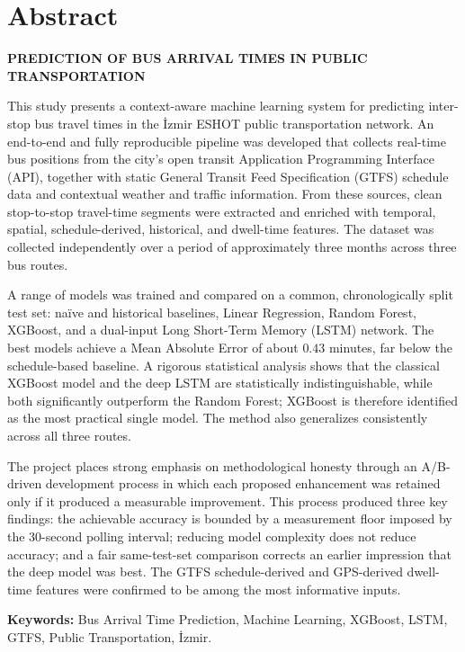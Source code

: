 \chapter*{Abstract}

\begin{center}
\textbf{PREDICTION OF BUS ARRIVAL TIMES IN PUBLIC TRANSPORTATION}
\end{center}

\vspace{0.5cm}

This study presents a context-aware machine learning system for predicting inter-stop bus travel times in the İzmir ESHOT public transportation network. An end-to-end and fully reproducible pipeline was developed that collects real-time bus positions from the city's open transit Application Programming Interface (API), together with static General Transit Feed Specification (GTFS) schedule data and contextual weather and traffic information. From these sources, clean stop-to-stop travel-time segments were extracted and enriched with temporal, spatial, schedule-derived, historical, and dwell-time features. The dataset was collected independently over a period of approximately three months across three bus routes.

A range of models was trained and compared on a common, chronologically split test set: naïve and historical baselines, Linear Regression, Random Forest, XGBoost, and a dual-input Long Short-Term Memory (LSTM) network. The best models achieve a Mean Absolute Error of about $0.43$ minutes, far below the schedule-based baseline. A rigorous statistical analysis shows that the classical XGBoost model and the deep LSTM are statistically indistinguishable, while both significantly outperform the Random Forest; XGBoost is therefore identified as the most practical single model. The method also generalizes consistently across all three routes.

The project places strong emphasis on methodological honesty through an A/B-driven development process in which each proposed enhancement was retained only if it produced a measurable improvement. This process produced three key findings: the achievable accuracy is bounded by a measurement floor imposed by the 30-second polling interval; reducing model complexity does not reduce accuracy; and a fair same-test-set comparison corrects an earlier impression that the deep model was best. The GTFS schedule-derived and GPS-derived dwell-time features were confirmed to be among the most informative inputs.

\vfill
\textbf{Keywords:} Bus Arrival Time Prediction, Machine Learning, XGBoost, LSTM, GTFS, Public Transportation, İzmir.
\clearpage
